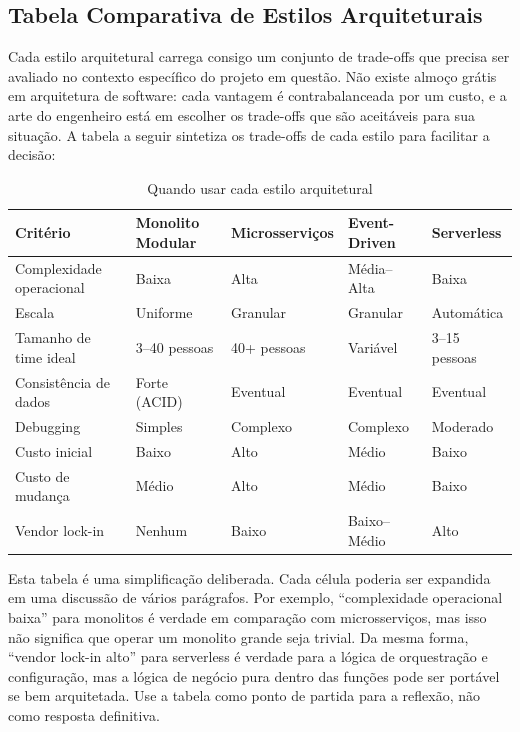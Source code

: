\subsection{Tabela Comparativa de Estilos Arquiteturais}

Cada estilo arquitetural carrega consigo um conjunto de trade-offs que precisa
ser avaliado no contexto específico do projeto em questão. Não existe almoço
grátis em arquitetura de software: cada vantagem é contrabalanceada por um
custo, e a arte do engenheiro está em escolher os trade-offs que são aceitáveis
para sua situação. A tabela a seguir sintetiza os trade-offs de cada estilo
para facilitar a decisão:

\begin{table}[htbp]
\centering
\caption{Quando usar cada estilo arquitetural}
\label{tab:estilos-arquiteturais}
\small
\begin{tabular}{p{2.8cm}p{2.5cm}p{2.5cm}p{2.5cm}p{2.5cm}}
\toprule
\textbf{Critério} & \textbf{Monolito Modular} & \textbf{Microsserviços} & \textbf{Event-Driven} & \textbf{Serverless} \\
\midrule
Complexidade operacional & Baixa & Alta & Média--Alta & Baixa \\
\addlinespace
Escala & Uniforme & Granular & Granular & Automática \\
\addlinespace
Tamanho de time ideal & 3--40 pessoas & 40+ pessoas & Variável & 3--15 pessoas \\
\addlinespace
Consistência de dados & Forte (ACID) & Eventual & Eventual & Eventual \\
\addlinespace
Debugging & Simples & Complexo & Complexo & Moderado \\
\addlinespace
Custo inicial & Baixo & Alto & Médio & Baixo \\
\addlinespace
Custo de mudança & Médio & Alto & Médio & Baixo \\
\addlinespace
Vendor lock-in & Nenhum & Baixo & Baixo--Médio & Alto \\
\bottomrule
\end{tabular}
\end{table}

Esta tabela é uma simplificação deliberada. Cada célula
poderia ser expandida em uma discussão de vários parágrafos. Por exemplo,
``complexidade operacional baixa'' para monolitos é verdade em comparação com
microsserviços, mas isso não significa que operar um monolito grande seja
trivial. Da mesma forma, ``vendor lock-in alto'' para serverless é verdade para
a lógica de orquestração e configuração, mas a lógica de negócio pura dentro
das funções pode ser portável se bem arquitetada. Use a tabela como ponto de
partida para a reflexão, não como resposta definitiva.

